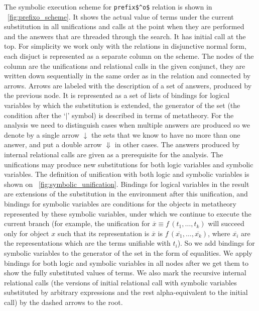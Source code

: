 The symbolic execution scheme for \lstinline|prefix$^o$| relation is shown in \figureword~\ref{fig:prefixo_scheme}. It shows the actual value of terms under the current
substitution in all unifications and calls at the point when they are performed and the answers that are threaded through the search. It has initial call at the top.
For simplicity we work only with the relations in disjunctive normal form, each disjuct is represented as a separate column on the scheme. The nodes of the column are
the unifications and relational calls in the given conjunct, they are written down sequentially in the same order as in the relation and connected by arrows. Arrows are
labeled with the description of a set of answers, produced by the previous node. It is represented as a set of lists of bindings for logical variables by which the
substitution is extended, the generator of the set (the condition after the `$\mid$' symbol) is described in terms of metatheory. For the analysis we need to distinguish
cases when multiple answers are produced so we denote by a single arrow $\downarrow$ the sets that we know to have no more than one answer, and put a double arrow $\Downarrow$
in other cases. The answers produced by internal relational calls are given as a prerequisite for the analysis. The unifications may produce new substitutions for
both logic variables and symbolic variables. The definition of unification with both logic and symbolic variables is shown on \figureword~\ref{fig:symbolic_unification}.
Bindings for logical variables in the result are extensions of the substitution in the environment after this unification, and bindings for symbolic variables are conditions
for the objects in metatheory represented by these symbolic variables, under which we continue to execute the current branch (for example, the unification for $\overline{x} \equiv f\,(t_1, \dots, t_k)$ will succeed only for object $x$ such that its representation is $\overline{x}$ is $f\,(\overline{x_1}, \dots, \overline{x_k})$, where $\overline{x_i}$ are the representations which are the terms
unifiable with $t_i$). So we add bindings for symbolic variables to the generator of the set in the form of equalities. We apply bindings for both logic and symbolic variables in
all nodes after we get them to show the fully substituted values of terms. We also mark the recursive internal relational calls (the versions of initial relational call with
symbolic variables substituted by arbitrary expressions and the rest alpha-equivalent to the initial call) by the dashed arrows to the root.

